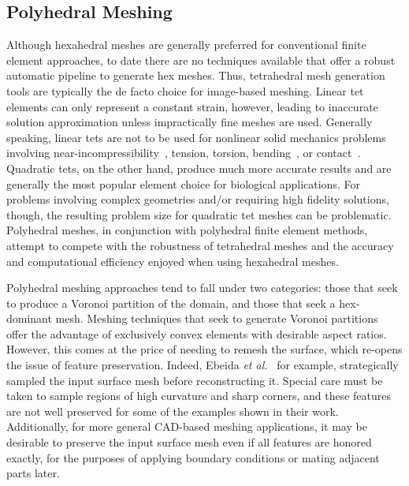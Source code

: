 \subsection{Polyhedral Meshing}
\label{Polyhedral Meshing}

Although hexahedral meshes are generally preferred for conventional finite element approaches, to date there are no techniques available that offer a robust automatic pipeline to generate hex meshes. Thus, tetrahedral mesh generation tools are typically the de facto choice for image-based meshing. Linear tet elements can only represent a constant strain, however, leading to inaccurate solution approximation unless impractically fine meshes are used. Generally speaking, linear tets are not to be used for nonlinear solid mechanics problems involving near-incompressibility~\cite{hughes_2007}, tension, torsion, bending~\cite{wang_2004, benzley_1995}, or contact~\cite{maas_2016}. Quadratic tets, on the other hand, produce much more accurate results and are generally the most popular element choice for biological applications. For problems involving complex geometries and/or requiring high fidelity solutions, though, the resulting problem size for quadratic tet meshes can be problematic. Polyhedral meshes, in conjunction with polyhedral finite element methods, attempt to compete with the robustness of tetrahedral meshes and the accuracy and computational efficiency enjoyed when using hexahedral meshes.

Polyhedral meshing approaches tend to fall under two categories: those that seek to produce a Voronoi partition of the domain, and those that seek a hex-dominant mesh. Meshing techniques that seek to generate Voronoi partitions~\cite{garimella_2014, lee_2015} offer the advantage of exclusively convex elements with desirable aspect ratios. However, this comes at the price of needing to remesh the surface, which re-opens the issue of feature preservation. Indeed, Ebeida \textit{et al.}~\cite{ebeida_2011, mitchell_2015} for example, strategically sampled the input surface mesh before reconstructing it. Special care must be taken to sample regions of high curvature and sharp corners, and these features are not well preserved for some of the examples shown in their work. Additionally, for more general CAD-based meshing applications, it may be desirable to preserve the input surface mesh even if all features are honored exactly, for the purposes of applying boundary conditions or mating adjacent parts later.

